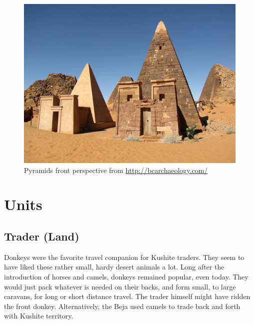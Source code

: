 \documentclass[a4paper,12pt]{scrreprt}
\begin{document}
\begin{figure}[H]
	\centering
	\includegraphics[width=\textwidth]{img/wonder/meroe-pyramids}
	\caption{Pyramids front perspective from \url{http://bcarchaeology.com/}}
\end{figure}

\section{Units}

\subsection{Trader (Land)}

Donkeys were the favorite travel companion for Kushite traders. They seem to have liked these rather small, hardy desert animals a lot. Long after the introduction of horses and camels, donkeys remained popular, even today. They would just pack whatever is needed on their backs, and form small, to large caravans, for long or short distance travel. The trader himself might have ridden the front donkey. Alternatively, the Beja used camels to trade back and forth with Kushite territory.
\end{document}

